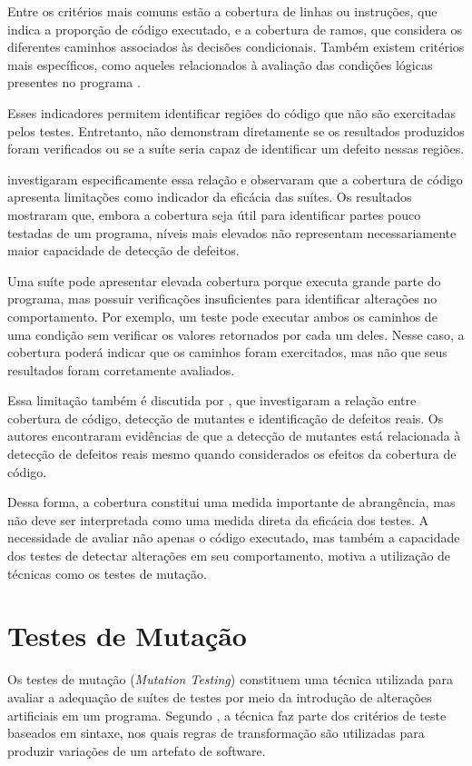 Entre os critérios mais comuns estão a cobertura de linhas ou instruções, que indica a proporção de código executado, e a cobertura de ramos, que considera os diferentes caminhos associados às decisões condicionais. Também existem critérios mais específicos, como aqueles relacionados à avaliação das condições lógicas presentes no programa \cite{ammann2016}.

Esses indicadores permitem identificar regiões do código que não são exercitadas pelos testes. Entretanto, não demonstram diretamente se os resultados produzidos foram verificados ou se a suíte seria capaz de identificar um defeito nessas regiões.

 investigaram especificamente essa relação e observaram que a cobertura de código apresenta limitações como indicador da eficácia das suítes. Os resultados mostraram que, embora a cobertura seja útil para identificar partes pouco testadas de um programa, níveis mais elevados não representam necessariamente maior capacidade de detecção de defeitos.

Uma suíte pode apresentar elevada cobertura porque executa grande parte do programa, mas possuir verificações insuficientes para identificar alterações no comportamento. Por exemplo, um teste pode executar ambos os caminhos de uma condição sem verificar os valores retornados por cada um deles. Nesse caso, a cobertura poderá indicar que os caminhos foram exercitados, mas não que seus resultados foram corretamente avaliados.

Essa limitação também é discutida por , que investigaram a relação entre cobertura de código, detecção de mutantes e identificação de defeitos reais. Os autores encontraram evidências de que a detecção de mutantes está relacionada à detecção de defeitos reais mesmo quando considerados os efeitos da cobertura de código.

Dessa forma, a cobertura constitui uma medida importante de abrangência, mas não deve ser interpretada como uma medida direta da eficácia dos testes. A necessidade de avaliar não apenas o código executado, mas também a capacidade dos testes de detectar alterações em seu comportamento, motiva a utilização de técnicas como os testes de mutação.

\section{Testes de Mutação}

Os testes de mutação (\textit{Mutation Testing}) constituem uma técnica utilizada para avaliar a adequação de suítes de testes por meio da introdução de alterações artificiais em um programa. Segundo , a técnica faz parte dos critérios de teste baseados em sintaxe, nos quais regras de transformação são utilizadas para produzir variações de um artefato de software.


